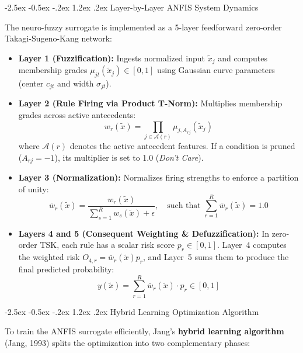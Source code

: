 \documentclass[12pt,a4paper,oneside]{report}
\makeatletter
\renewcommand\section{\@startsection {section}{1}{\z@}%
                                   {-2.5ex \@plus -0.5ex \@minus -.2ex}%
                                   {1.2ex \@plus .2ex}%
                                   {\normalfont\fontsize{13}{16}\selectfont\bfseries}}
\makeatother
\begin{document}
\section{Layer-by-Layer ANFIS System Dynamics}

The neuro-fuzzy surrogate is implemented as a 5-layer feedforward zero-order Takagi-Sugeno-Kang network:
\begin{itemize}
    \setlength{\itemsep}{0pt}
    \setlength{\parskip}{0pt}
    \item \textbf{Layer 1 (Fuzzification):} Ingests normalized input $\tilde{x}_j$ and computes membership grades $\mu_{jt}(\tilde{x}_j) \in [0, 1]$ using Gaussian curve parameters (center $c_{jt}$ and width $\sigma_{jt}$).
    \item \textbf{Layer 2 (Rule Firing via Product T-Norm):} Multiplies membership grades across active antecedents:
    \begin{equation}
        w_r(\tilde{x}) = \prod_{j \in \mathcal{A}(r)} \mu_{j, A_{rj}}(\tilde{x}_j)
    \end{equation}
    where $\mathcal{A}(r)$ denotes the active antecedent features. If a condition is pruned ($A_{rj} = -1$), its multiplier is set to 1.0 (\textit{Don't Care}).
    \item \textbf{Layer 3 (Normalization):} Normalizes firing strengths to enforce a partition of unity:
    \begin{equation}
        \bar{w}_r(\tilde{x}) = \frac{w_r(\tilde{x})}{\sum_{s=1}^R w_s(\tilde{x}) + \epsilon}, \quad \text{such that } \sum_{r=1}^R \bar{w}_r(\tilde{x}) = 1.0
    \end{equation}
    \item \textbf{Layers 4 and 5 (Consequent Weighting \& Defuzzification):} In zero-order TSK, each rule has a scalar risk score $p_r \in [0, 1]$. Layer~4 computes the weighted risk $O_{4, r} = \bar{w}_r(\tilde{x}) p_r$, and Layer~5 sums them to produce the final predicted probability:
    \begin{equation}
        y(\tilde{x}) = \sum_{r=1}^R \bar{w}_r(\tilde{x}) \cdot p_r \in [0, 1]
    \end{equation}
\end{itemize}

\section{Hybrid Learning Optimization Algorithm}

To train the ANFIS surrogate efficiently, Jang's \textbf{hybrid learning algorithm} (Jang, 1993) splits the optimization into two complementary phases:
\end{document}
